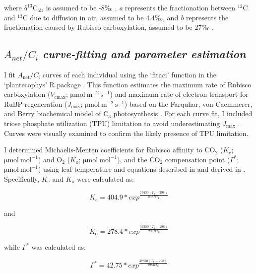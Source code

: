\noindent where $\mathrm{\delta^{13}C_{air}}$ is assumed to be -8‰ , \textit{a} represents the fractionation between $^{12}$C and $^{13}$C due to diffusion in air, assumed to be 4.4‰, and \textit{b} represents the fractionation caused by Rubisco carboxylation, assumed to be 27‰ .
    
\subsection{$A_{net}/C_i$ \textit{curve-fitting and parameter estimation}}
\noindent I fit $A_\mathrm{net}/C_\mathrm{i}$ curves of each individual using the ‘fitaci’ function in the ‘plantecophys’ R package . This function estimates the maximum rate of Rubisco carboxylation ($V_\mathrm{cmax}$; $\mathrm{\mu mol\ m^{-2}\ s^{-1}}$) and maximum rate of electron transport for RuBP regeneration ($J_\mathrm{max}$; $\mathrm{\mu mol\ m^{-2}\ s^{-1}}$) based on the Farquhar, von Caemmerer, and Berry biochemical model of C$_{3}$ photosynthesis . For each curve fit, I included triose phosphate utilization (TPU) limitation to avoid underestimating $J_{\mathrm{max}}$ . Curves were visually examined to confirm the likely presence of TPU limitation. 
    
I determined Michaelis-Menten coefficients for Rubisco affinity to CO$_2$ ($K_\mathrm{c}$; $\mathrm{\mu mol\ mol^{-1}}$) and $\mathrm{O_2}$ ($K_\mathrm{o}$; $\mathrm{\mu mol\ mol^{-1}}$), and the CO$_2$ compensation point ($\Gamma^*$; $\mathrm{\mu mol\ mol^{-1}}$) using leaf temperature and equations described in  and derived in . Specifically, $K_\mathrm{c}$ and $K_\mathrm{o}$ were calculated as:

\begin{equation} \label{eq_2.3}
    K_\mathrm{c}=404.9*exp^{\frac{79430(T_\mathrm{k}-298)}{298RT_\mathrm{k}}}
\end{equation}
    
\noindent and
    
\begin{equation} \label{eq_2.4}
    K_\mathrm{o}=278.4*exp^{\frac{36380(T_\mathrm{k}-298)}{298RT_\mathrm{k}}}
\end{equation}
    
\noindent while $\Gamma^*$ was calculated as:
    
\begin{equation} \label{eq_2.5}
    \Gamma^\mathrm{*}=42.75*exp^{\frac{37830(T_\mathrm{k}-298)}{298RT_\mathrm{k}}}
\end{equation}


